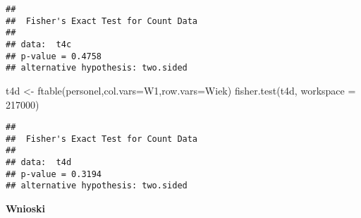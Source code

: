 \documentclass[
]{article}
\newenvironment{Shaded}{\begin{snugshade}}{\end{snugshade}}
\newcommand{\AttributeTok}[1]{\textcolor[rgb]{0.77,0.63,0.00}{#1}}
\newcommand{\DecValTok}[1]{\textcolor[rgb]{0.00,0.00,0.81}{#1}}
\newcommand{\FunctionTok}[1]{\textcolor[rgb]{0.00,0.00,0.00}{#1}}
\newcommand{\NormalTok}[1]{#1}
\newcommand{\OtherTok}[1]{\textcolor[rgb]{0.56,0.35,0.01}{#1}}
\newcommand{\StringTok}[1]{\textcolor[rgb]{0.31,0.60,0.02}{#1}}
\begin{document}
\begin{verbatim}
## 
##  Fisher's Exact Test for Count Data
## 
## data:  t4c
## p-value = 0.4758
## alternative hypothesis: two.sided
\end{verbatim}

\begin{Shaded}
\begin{Highlighting}[]
\NormalTok{t4d }\OtherTok{\textless{}{-}} \FunctionTok{ftable}\NormalTok{(personel,}\AttributeTok{col.vars=}\StringTok{\textquotesingle{}W1\textquotesingle{}}\NormalTok{,}\AttributeTok{row.vars=}\StringTok{\textquotesingle{}Wiek\textquotesingle{}}\NormalTok{)}
\FunctionTok{fisher.test}\NormalTok{(t4d, }\AttributeTok{workspace =} \DecValTok{217000}\NormalTok{)}
\end{Highlighting}
\end{Shaded}

\begin{verbatim}
## 
##  Fisher's Exact Test for Count Data
## 
## data:  t4d
## p-value = 0.3194
## alternative hypothesis: two.sided
\end{verbatim}

\textbf{Wnioski}
\end{document}

